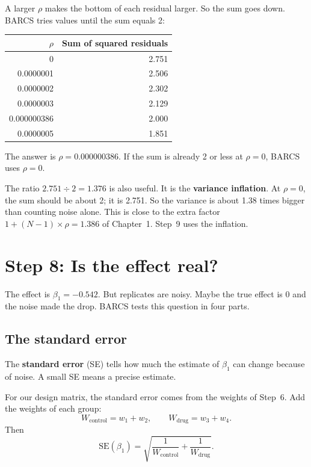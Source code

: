 \begin{worked}
A larger $\rho$ makes the bottom of each residual larger. So the sum goes
down. BARCS tries values until the sum equals 2:

\begin{tabular}{@{}rr@{}}
\toprule
$\rho$ & Sum of squared residuals\\
\midrule
0           & 2.751\\
0.0000001   & 2.506\\
0.0000002   & 2.302\\
0.0000003   & 2.129\\
0.000000386 & 2.000\\
0.0000005   & 1.851\\
\bottomrule
\end{tabular}

\smallskip
The answer is $\rho = 0.000000386$. If the sum is already 2 or less at
$\rho = 0$, BARCS uses $\rho = 0$.
\end{worked}

The ratio $2.751 \div 2 = 1.376$ is also useful. It is the
\textbf{variance inflation}. At $\rho = 0$, the sum should be about 2; it is
2.751. So the variance is about 1.38 times bigger than counting noise alone.
This is close to the extra factor $1 + (N-1) \times \rho = 1.386$ of
Chapter~1. Step~9 uses the inflation.

\section{Step 8: Is the effect real?}

The effect is $\beta_1 = -0.542$. But replicates are noisy. Maybe the true
effect is 0 and the noise made the drop. BARCS tests this question in four
parts.

\subsection{The standard error}

The \textbf{standard error} (SE) tells how much the estimate of $\beta_1$
can change because of noise. A small SE means a precise estimate.

For our design matrix, the standard error comes from the weights of Step~6.
Add the weights of each group:
\[
W_{\text{control}} = w_1 + w_2, \qquad W_{\text{drug}} = w_3 + w_4.
\]
Then
\[
\text{SE}(\beta_1) = \sqrt{\frac{1}{W_{\text{control}}} +
\frac{1}{W_{\text{drug}}}}.
\]

